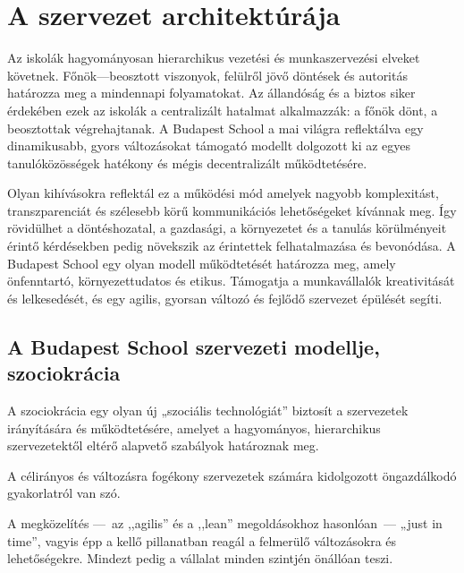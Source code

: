 \vspace*{.5ex}
\hypertarget{szervezet-architekturaja}{%
\section{A szervezet architektúrája}\label{szervezet-architekturaja}}

Az iskolák hagyományosan hierarchikus vezetési és munkaszervezési
elveket követnek. Főnök---beosztott viszonyok, felülről jövő döntések és
autoritás határozza meg a mindennapi folyamatokat. Az állandóság és a
biztos siker érdekében ezek az iskolák a centralizált hatalmat
alkalmazzák: a főnök dönt, a beosztottak végrehajtanak. A Budapest
School a mai világra reflektálva egy dinamikusabb, gyors változásokat
támogató modellt dolgozott ki az egyes tanulóközösségek hatékony és
mégis decentralizált működtetésére.

Olyan kihívásokra reflektál ez a működési mód amelyek nagyobb\break
komplexitást, transzparenciát és szélesebb körű kommunikációs
lehetőségeket kívánnak meg. Így rövidülhet a döntéshozatal, a gazdasági,
a környezetet és a tanulás körülményeit érintő kérdésekben pedig
növekszik az érintettek felhatalmazása és bevonódása. A Budapest School
egy olyan modell működtetését határozza meg, amely önfenntartó,
környezettudatos és etikus. Támogatja a munkavállalók kreativitását és
lelkesedését, és egy agilis, gyorsan változó és fejlődő szervezet
épülését segíti.

\vspace*{.5ex}
\hypertarget{a-budapest-school-szervezeti-modellje-szociokracia}{%
\subsection{A Budapest School szervezeti modellje,
szociokrácia}\label{a-budapest-school-szervezeti-modellje-szociokracia}}

A szociokrácia egy olyan új „szociális technológiát'' biztosít a
szervezetek irányítására és működtetésére, amelyet a hagyományos,
hierarchikus szervezetektől eltérő alapvető szabályok határoznak meg.


A célirányos és változásra fogékony
szervezetek számára kidolgozott öngazdálkodó gyakorlatról van szó.

A megközelítés ---~az ,,agilis'' és a ,,lean'' megoldásokhoz hasonlóan~--- „just in
time'', vagyis épp a kellő pillanatban reagál a felmerülő változásokra és
lehetőségekre. Mindezt pedig a vállalat minden szintjén önállóan teszi.

